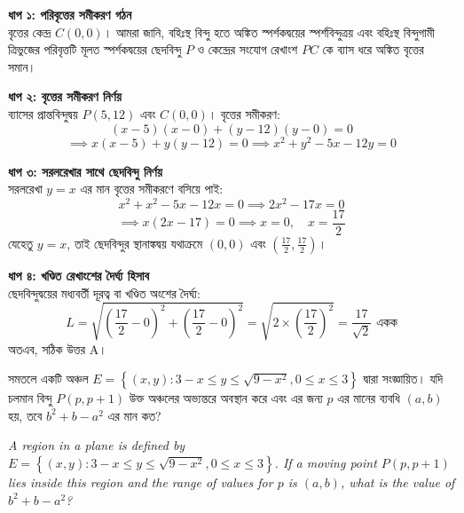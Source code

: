 \documentclass[12pt, a4paper]{article}
\begin{document}
\begin{tcolorbox}[solutionbox={সমাধান (Solution)}]
    \noindent
    \textbf{ধাপ ১: পরিবৃত্তের সমীকরণ গঠন} \\
    বৃত্তের কেন্দ্র $C(0,0)$। আমরা জানি, বহিঃস্থ বিন্দু হতে অঙ্কিত স্পর্শকদ্বয়ের স্পর্শবিন্দুত্রয় এবং বহিঃস্থ বিন্দুগামী ত্রিভুজের পরিবৃত্তটি মূলত স্পর্শকদ্বয়ের ছেদবিন্দু $P$ ও কেন্দ্রের সংযোগ রেখাংশ $PC$ কে ব্যাস ধরে অঙ্কিত বৃত্তের সমান।
    
    \vspace{0.5em}
    \noindent\textbf{ধাপ ২: বৃত্তের সমীকরণ নির্ণয়} \\
    ব্যাসের প্রান্তবিন্দুদ্বয় $P(5, 12)$ এবং $C(0, 0)$। বৃত্তের সমীকরণ:
    \[ (x - 5)(x - 0) + (y - 12)(y - 0) = 0 \]
    \[ \implies x(x - 5) + y(y - 12) = 0 \implies x^2 + y^2 - 5x - 12y = 0 \]
    
    \vspace{0.5em}
    \noindent\textbf{ধাপ ৩: সরলরেখার সাথে ছেদবিন্দু নির্ণয়} \\
    সরলরেখা $y = x$ এর মান বৃত্তের সমীকরণে বসিয়ে পাই:
    \[ x^2 + x^2 - 5x - 12x = 0 \implies 2x^2 - 17x = 0 \]
    \[ \implies x(2x - 17) = 0 \implies x = 0, \quad x = \frac{17}{2} \]
    যেহেতু $y = x$, তাই ছেদবিন্দুর স্থানাঙ্কদ্বয় যথাক্রমে $(0, 0)$ এবং $\left(\frac{17}{2}, \frac{17}{2}\right)$।
    
    \vspace{0.5em}
    \noindent\textbf{ধাপ ৪: খণ্ডিত রেখাংশের দৈর্ঘ্য হিসাব} \\
    ছেদবিন্দুদ্বয়ের মধ্যবর্তী দূরত্ব বা খণ্ডিত অংশের দৈর্ঘ্য:
    \[ L = \sqrt{\left(\frac{17}{2} - 0\right)^2 + \left(\frac{17}{2} - 0\right)^2} = \sqrt{2 \times \left(\frac{17}{2}\right)^2} = \frac{17}{\sqrt{2}} \text{ একক} \]
    অতএব, সঠিক উত্তর A।
\end{tcolorbox}
\begin{tcolorbox}[questionbox={প্রশ্ন (Question) 4}]
    \noindent
    সমতলে একটি অঞ্চল $E = \left\{(x, y) : 3 - x \le y \le \sqrt{9 - x^2}, 0 \le x \le 3\right\}$ দ্বারা সংজ্ঞায়িত। যদি চলমান বিন্দু $P(p, p+1)$ উক্ত অঞ্চলের অভ্যন্তরে অবস্থান করে এবং এর জন্য $p$ এর মানের ব্যবধি $(a, b)$ হয়, তবে $b^2 + b - a^2$ এর মান কত?
    
    \vspace{0.8em}
    \begin{english}
    \noindent\textit{\color{darkgray}
    A region in a plane is defined by $E = \left\{(x, y) : 3 - x \le y \le \sqrt{9 - x^2}, 0 \le x \le 3\right\}$. If a moving point $P(p, p+1)$ lies inside this region and the range of values for $p$ is $(a, b)$, what is the value of $b^2 + b - a^2$?
    }
    \end{english}
\end{tcolorbox}
\end{document}
